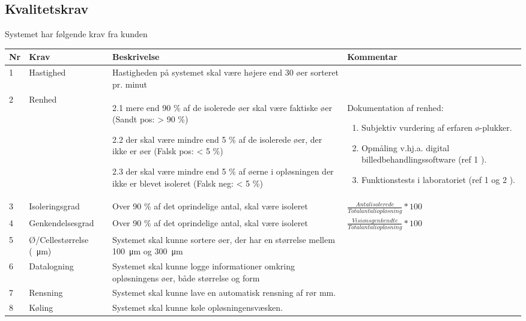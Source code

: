 \subsection{Kvalitetskrav}
Systemet har følgende krav fra kunden
\begin{center}
		\begin{longtable}{ | m{0.5cm} | m{3cm}| m{6cm}| m{4cm} |} 
			\hline
			\textbf{Nr} & \textbf{Krav} & \textbf{Beskrivelse} & \textbf{Kommentar} \\ 
			\hline
			1 & Hastighed & Hastigheden på systemet skal være højere end 30 øer sorteret pr. minut & \\
			\hline
			2 & Renhed & 2.1 mere end 90 \% af de isolerede øer skal være faktiske øer 
(Sandt pos: > 90 \%)

2.2 der skal være mindre end 5 \% af de isolerede øer, der ikke er øer
(Falsk pos: < 5 \%)

2.3 der skal være mindre end 5 \% af øerne i opløsningen der ikke er blevet isoleret
(Falsk neg: < 5 \%)
 & Dokumentation af renhed:
 \begin{enumerate}
 \item Subjektiv vurdering af erfaren ø-plukker.
 \item Opmåling v.hj.a. digital billedbehandlingssoftware (ref 1 ).
  \item Funktionstests i laboratoriet (ref 1 og 2 ).
 \end{enumerate} \\
			\hline
			3 & Isoleringsgrad & Over 90 \% af det oprindelige antal, skal være isoleret &
			 $\frac{Antal isolerede}{Total antal i opløsning} * 100$\\
			\hline
			4 & Genkendelsesgrad & Over 90 \% af det oprindelige antal, skal være isoleret &
			 $\frac{Visionsgenkendte}{Total antal i opløsning} * 100$\\
			\hline
			5 & Ø/Cellestørrelse (\SI{}{\micro\metre}) & Systemet skal kunne sortere øer, der
har en størrelse mellem \SI{100}{\micro\metre} og \SI{300}{\micro\metre}
 &		\\
			\hline
			6 & Datalogning & Systemet skal kunne logge informationer omkring opløsningens øer, både størrelse og form & \\
			\hline
			7 & Rensning & Systemet skal kunne lave en automatisk rensning af rør mm. & \\
			\hline
			8 & Køling & Systemet skal kunne køle opløsningensvæsken. & \\
			\hline
		\end{longtable}
		
		
		
	\end{center}
	\pagebreak